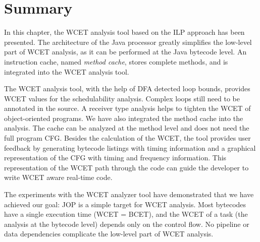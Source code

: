 %
%

%



\section{Summary}
\label{sec:wcet:summary}

In this chapter, the WCET analysis tool based on the ILP approach has
been presented. The architecture of the Java processor greatly
simplifies the low-level part of WCET analysis, as it can be
performed at the Java bytecode level. An instruction cache, named
\emph{method cache}, stores complete methods, and is integrated into
the WCET analysis tool.

The WCET analysis tool, with the help of DFA detected loop bounds,
provides WCET values for the schedulability analysis. Complex loops
still need to be annotated in the source. A receiver type analysis
helps to tighten the WCET of object-oriented programs. We have also
integrated the method cache into the analysis. The cache can be
analyzed at the method level and does not need the full program CFG.
Besides the calculation of the WCET, the tool provides user feedback
by generating bytecode listings with timing information and a
graphical representation of the CFG with timing and frequency
information. This representation of the WCET path through the code
can guide the developer to write WCET aware real-time code.

The experiments with the WCET analyzer tool have demonstrated that we
have achieved our goal: JOP is a simple target for WCET analysis.
Most bytecodes have a single execution time (WCET = BCET), and the
WCET of a task (the analysis at the bytecode level) depends only on
the control flow. No pipeline or data dependencies complicate the
low-level part of WCET analysis.

